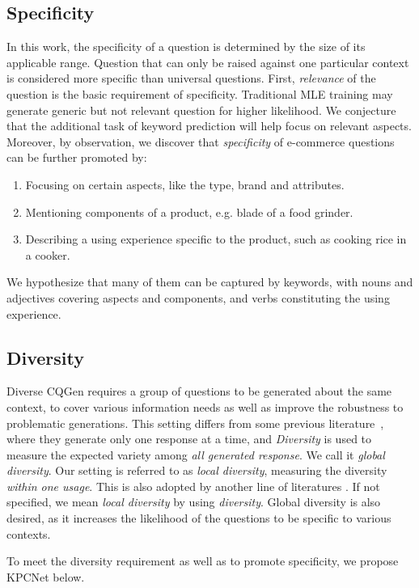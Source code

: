 \subsection{Specificity}
\label{sec:specific}
In this work, the specificity of a question is determined by the size of 
its applicable range. Question that can only be raised against one particular context is 
considered more specific than universal questions. 
First, \textit{relevance} of the question is the basic
requirement of specificity.  Traditional MLE training may generate generic but not 
relevant question for higher likelihood. We conjecture that the 
additional task of keyword prediction will help focus on relevant aspects. 
Moreover, by observation, we discover that \textit{specificity} of e-commerce questions can be further promoted by: 
\begin{enumerate}
  \item Focusing on certain aspects, like the type, brand and attributes.
  \item Mentioning components of a product, e.g. blade of a food grinder.
  \item Describing a using experience specific to the product, such as cooking rice in a cooker.
\end{enumerate}

We hypothesize that many of them can be captured by keywords, with nouns and adjectives covering aspects and components, and verbs constituting the using experience.

\subsection{Diversity}
\label{sec:diversity}

Diverse CQGen requires a group of questions to be generated about the same context, to cover various information needs as well as improve the robustness to problematic generations. This setting differs from some previous 
literature~\citep{wang2018learning, rao2019answer}, where they generate 
only one response at a time, and \textit{Diversity} is used to measure 
the expected variety among 
\textit{all generated response}. We call it \textit{global diversity}. 
Our setting is referred to as \textit{local diversity}, measuring 
the diversity \textit{within one usage}. This is also adopted by another 
line of literatures \citep{vijayakumar2018diverse, shen2019mixture}. 
If not specified, we mean \textit{local diversity} by using \textit{diversity}. 
Global diversity is also desired, as it increases the likelihood of the questions to be specific to various contexts. 

To meet the diversity requirement as well as to promote specificity, we propose KPCNet below.

